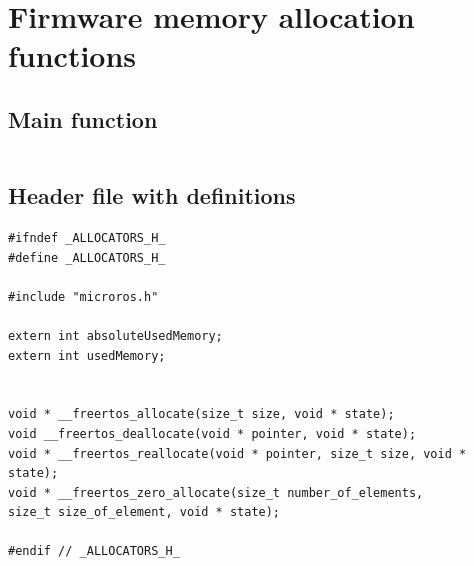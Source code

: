 \documentclass[10pt]{article}
\begin{document}
\pagebreak
\section{Firmware memory allocation functions}
\label{sec:allocfunctions}

\subsection{Main function}
\inputminted[linenos]{c}{./src/allocators.c}

\subsection{Header file with definitions}
\begin{verbatim}
#ifndef _ALLOCATORS_H_
#define _ALLOCATORS_H_

#include "microros.h"

extern int absoluteUsedMemory;
extern int usedMemory;


void * __freertos_allocate(size_t size, void * state);
void __freertos_deallocate(void * pointer, void * state);
void * __freertos_reallocate(void * pointer, size_t size, void * state);
void * __freertos_zero_allocate(size_t number_of_elements,
size_t size_of_element, void * state);

#endif // _ALLOCATORS_H_
\end{verbatim}
\end{document}
